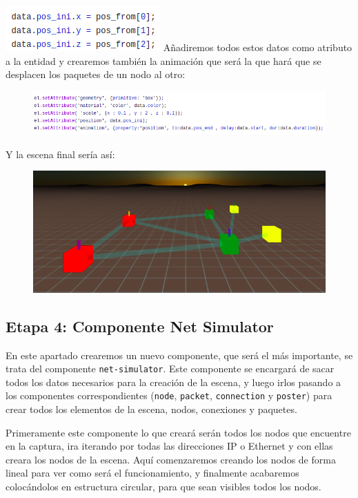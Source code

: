 \documentclass[a4paper, 12pt]{book}
\begin{document}
    \includegraphics[scale=0.7]{img/pos_packet2.png}
\newpage
Añadiremos todos estos datos como atributo a la entidad y crearemos también la animación que será la que hará que se desplacen los paquetes de un nodo al otro:


\begin{figure}[h]
\centering
    \includegraphics[scale=0.6]{img/atributos_packet.png}
\end{figure}

Y la escena  final sería así:
\begin{figure}[h]
\centering
    \includegraphics[scale=0.7]{img/componentePACKET.png}
\end{figure}

\newpage
\subsection{Etapa 4: Componente Net Simulator}
En este apartado crearemos un nuevo componente, que será el más importante, se trata del componente \texttt{net-simulator}.
Este componente se encargará de sacar todos los datos necesarios para la creación de la escena, y luego irlos pasando a los componentes correspondientes (\texttt{node}, \texttt{packet}, \texttt{connection} y \texttt{poster}) para crear todos los elementos de la escena, nodos, conexiones y paquetes.

Primeramente este componente lo que creará serán todos los nodos que encuentre en la captura, ira iterando por todas las direcciones IP o Ethernet y con ellas creara los nodos de la escena. Aquí comenzaremos creando los nodos de forma lineal para ver como será el funcionamiento, y finalmente acabaremos colocándolos en estructura circular, para que sean visibles todos los nodos.
\end{document}
